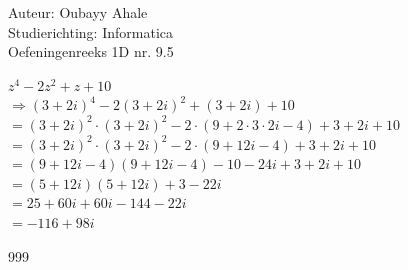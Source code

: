 \documentclass[a4paper]{article}
\begin{document}
  
\noindent \large Auteur: Oubayy Ahale          \\
\noindent \large Studierichting: Informatica   \\
\noindent \large Oefeningenreeks 1D nr. 9.5    \\

\medskip

\normalsize

$ z^4 - 2z^2 + z + 10 $\\

$ \Rightarrow (3 + 2i)^4 - 2(3 + 2i)^2 + (3 + 2i) + 10 $\\

$ = (3 + 2i)^2 \cdot (3 + 2i)^2 - 2 \cdot (9 + 2 \cdot 3 \cdot 2i - 4) + 3 + 2i + 10 $\\

$ = (3 + 2i)^2 \cdot (3 + 2i)^2 - 2 \cdot (9 + 12i - 4) + 3 + 2i + 10 $\\

$ = (9 + 12i - 4)(9 + 12i - 4) - 10 - 24i + 3 + 2i + 10 $\\

$ = (5 + 12i)(5 + 12i) + 3 - 22i $\\

$ = 25 + 60i + 60i - 144 - 22i $\\

$ = -116 + 98i $\\

\begin{thebibliography}{999}
\end{thebibliography}
\end{document}
